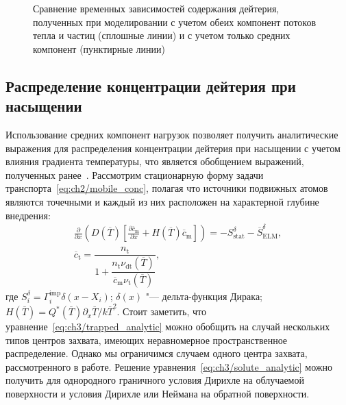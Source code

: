 \begin{figure}[ht]
	\caption{Сравнение временных зависимостей содержания дейтерия, полученных при моделировании с учетом обеих компонент потоков тепла и частиц (сплошные линии) и с учетом только средних компонент (пунктирные линии)}\label{fig:ch3/Eqv_load}
\end{figure}

\subsection{Распределение концентрации дейтерия при насыщении}\label{sec:ch3/sec3/subsec2}
Использование средних компонент нагрузок позволяет получить аналитические выражения для распределения концентрации дейтерия при насыщении с учетом влияния градиента температуры, что является обобщением выражений, полученных ранее~\cite{Denis2022}. Рассмотрим стационарную форму задачи транспорта~\cref{eq:ch2/mobile_conc}, полагая что источники подвижных атомов являются точечными и каждый из них расположен на характерной глубине внедрения:
\begin{subequations}
	\label{eq:ch3/eq:solute_analytic}
	\begin{gather}
	\frac{\partial}{\partial x}\left(D(\overline{T})\left[\frac{\partial \overline{c}_{\mathrm{m}}}{\partial x} +H(\overline{T})\overline{c}_{\mathrm{m}}\right] \right)= - S_{\mathrm{stat}}^{\delta}-\overline{S}_{\mathrm{ELM}}^{\delta}, \label{eq:ch3/solute_analytic}\\
	\overline{c}_{\mathrm{t}}=\dfrac{n_{\mathrm{t}}}{1+\dfrac{n_{\mathrm{t}}\nu_{\mathrm{dt}}(\overline{T})}{\overline{c}_{\mathrm{m}}\nu_{\mathrm{t}}(\overline{T})}},\label{eq:ch3/trapped_analytic}
	\end{gather}
\end{subequations}
где $S_i^\delta=\Gamma_i^{\mathrm{imp}}\delta(x-X_i)$; $\delta(x)$ "--- дельта-функция Дирака; $H(\overline{T})=Q^*(\overline{T})\partial_x \overline{T}/k\overline{T}^2$. Стоит заметить, что уравнение~\cref{eq:ch3/trapped_analytic} можно обобщить на случай нескольких типов центров захвата, имеющих неравномерное пространственное распределение. Однако мы ограничимся случаем одного центра захвата, рассмотренного в работе. Решение уравнения~\cref{eq:ch3/solute_analytic} можно получить для однородного граничного условия Дирихле на облучаемой поверхности и условия Дирихле или Неймана на обратной поверхности.

